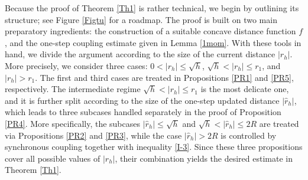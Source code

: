 \documentclass[aap]{imsart}
\theoremstyle{plain}
\theoremstyle{definition}
\begin{document}
Because the proof of Theorem \ref{Th1} is rather technical, we begin by
outlining its structure; see Figure \ref{Figtu} for a roadmap. The proof is built on two
main preparatory ingredients: the construction of a suitable concave distance
function \(f\), and the one-step coupling estimate given in Lemma \ref{1mom}.
With these tools in hand, we divide the argument according to the size of the
current distance \(|r_h|\). More precisely, we consider three cases:
\(0<|r_h|\leqslant \sqrt h\), \(\sqrt h<|r_h|\leqslant r_1\), and
\(|r_h|>r_1\). The first and third cases are treated in
Propositions \ref{PR1} and \ref{PR5}, respectively. The intermediate regime
\(\sqrt h<|r_h|\leqslant r_1\) is the most delicate one, and it is further
split according to the size of the one-step updated distance
\(|\widehat r_h|\), which leads to three subcases handled separately in the
proof of Proposition \ref{PR4}. More specifically, the subcases
\(|\widehat r_h|\leqslant \sqrt h\) and
\(\sqrt h<|\widehat r_h|\leqslant 2R\) are treated via
Propositions \ref{PR2} and \ref{PR3}, while the case
\(|\widehat r_h|>2R\) is controlled by synchronous coupling together with
inequality \eqref{I-3}. Since these three propositions cover all possible
values of \(|r_h|\), their combination yields the desired estimate in Theorem
\ref{Th1}.
\end{document}
